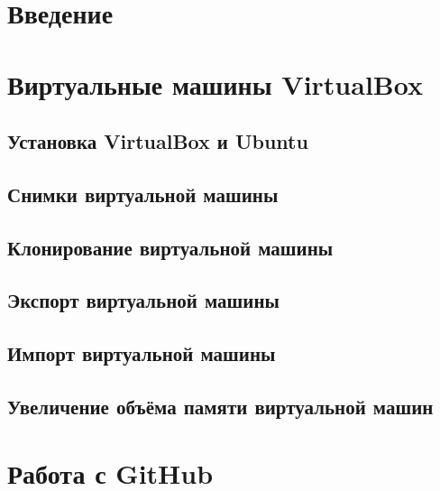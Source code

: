 \documentclass[oneside,final,14pt]{extarticle} %
\begin{document}


\setcounter{page}{2}

\setlength{\parindent}{1.25cm}

\tableofcontents
\newpage

\section*{Введение}

\newpage

\section{Виртуальные машины VirtualBox}
\subsection{Установка VirtualBox и Ubuntu}

\newpage

\subsection{Снимки виртуальной машины}

\newpage

\subsection{Клонирование виртуальной машины}

\newpage

\subsection{Экспорт виртуальной машины}

\newpage

\subsection{Импорт виртуальной машины}

\newpage

\subsection{Увеличение объёма памяти виртуальной машин}

\newpage

\section{Работа с GitHub}
\end{document}
